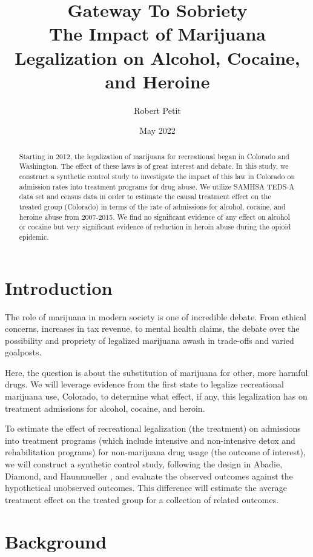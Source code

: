 \documentclass{article}
\title{Gateway To Sobriety \\
    \large The Impact of Marijuana Legalization on Alcohol, Cocaine, and Heroine}
\author{Robert Petit}
\date{May 2022}
\begin{document}
\maketitle

\begin{abstract}
    Starting in 2012, the legalization of marijuana for recreational began in Colorado and Washington. The effect of these laws is of great interest and debate. In this study, we construct a synthetic control study to investigate the impact of this law in Colorado on admission rates into treatment programs for drug abuse. We utilize SAMHSA TEDS-A data set and census data in order to estimate the causal treatment effect on the treated group (Colorado) in terms of the rate of admissions for alcohol, cocaine, and heroine abuse from 2007-2015. We find no significant evidence of any effect on alcohol or cocaine but very significant evidence of reduction in heroin abuse during the opioid epidemic.
\end{abstract}

\section{Introduction}

The role of marijuana in modern society is one of incredible debate. From ethical concerns, increases in tax revenue, to mental health claims, the debate over the possibility and propriety of legalized marijuana awash in trade-offs and varied goalposts.

Here, the question is about the substitution of marijuana for other, more harmful drugs. We will leverage evidence from the first state to legalize recreational marijuana use, Colorado, to determine what effect, if any, this legalization has on treatment admissions for alcohol, cocaine, and heroin.

To estimate the effect of recreational legalization (the treatment) on admissions into treatment programs (which include intensive and non-intensive detox and rehabilitation programs) for non-marijuana drug usage (the outcome of interest), we will construct a synthetic control study, following the design in Abadie, Diamond, and Haunmueller \citeyearpar{SynthControl}, and evaluate the observed outcomes against the hypothetical unobserved outcomes. This difference will estimate the average treatment effect on the treated group for a collection of related outcomes.

\section{Background}
\end{document}
